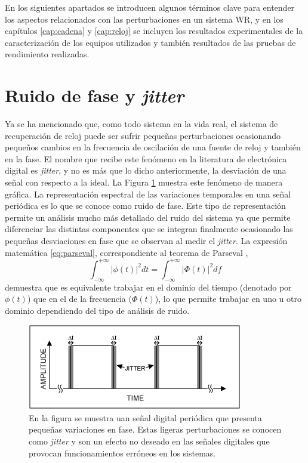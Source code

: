 En los siguientes apartados se introducen algunos términos clave para entender 
los aspectos relacionados con las perturbaciones en un sistema WR, y en los 
capítulos \ref{cap:cadena} y \ref{cap:reloj} se incluyen los resultados 
experimentales de la caracterización de los equipos utilizados y también 
resultados de las pruebas de rendimiento realizadas.

\section{Ruido de fase y \textit{jitter}}

Ya se ha mencionado que, como todo sistema en la vida real, el sistema de 
recuperación de reloj puede ser sufrir pequeñas perturbaciones ocasionando 
pequeños cambios en la frecuencia de oscilación de una fuente de reloj y 
también en la fase. El nombre que recibe este fenómeno en la literatura de 
electrónica digital es \textit{jitter}, y no es más que lo dicho anteriormente, 
la desviación de una señal con respecto a la ideal. La Figura \ref{fig:jitter} 
muestra este fenómeno de manera gráfica. La representación espectral de las 
variaciones temporales en una señal periódica es lo que se conoce como ruido de 
fase. Este tipo de representación permite un análisis mucho más detallado del 
ruido del sistema ya que permite diferenciar las distintas componentes que se 
integran finalmente ocasionado las pequeñas desviaciones en fase que se 
observan al medir el \textit{jitter}. La expresión matemática 
\ref{eq:parseval}, correspondiente al teorema de Parseval \cite{oppenheim96},
\begin{equation}\label{eq:parseval}
\int_{-\infty}^{+\infty} | \phi (t) |^2 dt = 
\int_{-\infty}^{+\infty} | \Phi (t) |^2 df
\end{equation}
 demuestra que es equivalente trabajar en el dominio del tiempo (denotado por 
 $\phi (t)$) que en el de la frecuencia ($\Phi (t)$), lo que permite trabajar 
 en uno u otro dominio dependiendo del tipo de análisis de ruido.



\begin{figure}
	\centering
	\includegraphics[width=0.5\linewidth]{imagenes/jitter}
	\caption[Ilustración del fenómeno conocido como \textit{jitter}]{En la 
	figura se muestra uan señal digital periódica que presenta pequeñas 
	variaciones en fase. Estas ligeras perturbaciones se conocen como 
	\textit{jitter} y son un efecto no deseado en las señales digitales que 
	provocan funcionamientos erróneos en los sistemas.}
	\label{fig:jitter}
\end{figure}


